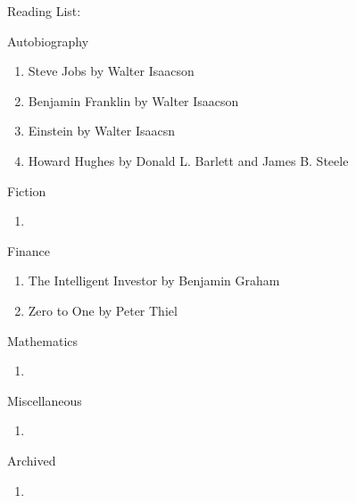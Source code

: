 \documentclass{article}
\begin{document}
\Huge Reading List: 

\hrulefill

\LARGE Autobiography

\normalsize 
    \begin{enumerate}
        \item Steve Jobs by Walter Isaacson
        \item Benjamin Franklin by Walter Isaacson
        \item Einstein by Walter Isaacsn 
        \item Howard Hughes by Donald L. Barlett and James B. Steele
    \end{enumerate}

\LARGE Fiction

\normalsize
    \begin{enumerate}
        \item 
    \end{enumerate}

\LARGE Finance

\normalsize
    \begin{enumerate}
        \item The Intelligent Investor by Benjamin Graham
        \item Zero to One by Peter Thiel
    \end{enumerate}



\LARGE Mathematics

\normalsize
    \begin{enumerate}
        \item 
    \end{enumerate}

\LARGE Miscellaneous

\normalsize
    \begin{enumerate}
        \item  
    \end{enumerate}
\hrulefill



\LARGE Archived

\normalsize
    \begin{enumerate}
        \item 
    \end{enumerate}

    
\end{document}

